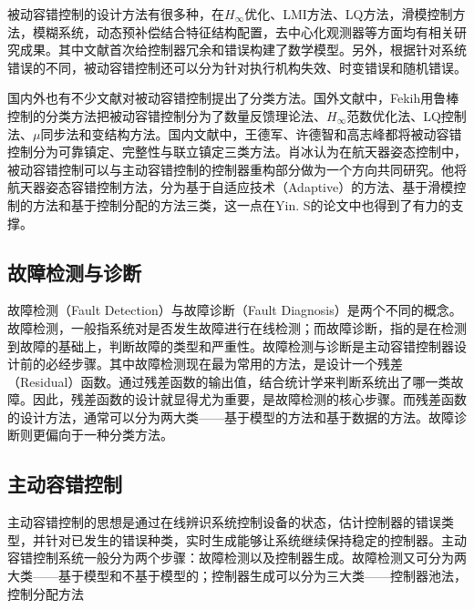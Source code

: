 \documentclass{article}
\begin{document}
被动容错控制的设计方法有很多种，在$H_\infty$优化\cite{119629,7850999}、LMI方法\cite{7795198,974340,1236798}、LQ方法\cite{VEILLETTE1995137,847106,866928}，滑模控制方法\cite{4160860}，模糊系统\cite{7795198,7505963,Zha20173267}，动态预补偿结合特征结构配置\cite{Jiang2000Design,ZHAO19981267}，去中心化观测器\cite{70346}等方面均有相关研究成果。其中文献\cite{ZHAO19981267}首次给控制器冗余和错误构建了数学模型。另外，根据针对系统错误的不同，被动容错控制还可以分为针对执行机构失效\cite{ZHAO19981267,974340,VEILLETTE1995137,1236798,Tian20101907,Li20132455,7353144,7863042,70346,866928}、时变错误\cite{7850999,CHEN2004349,6064886}和随机错误\cite{7795198,7505963,5540530,Zha20173267}。

国内外也有不少文献对被动容错控制提出了分类方法。国外文献中，Fekih\cite{6859271}用鲁棒控制的分类方法把被动容错控制分为了数量反馈理论法、$H_\infty$范数优化法\cite{4079591}、LQ控制法\cite{Staroswiecki20072070}、$\mu$同步法和变结构方法。国内文献中，王德军\cite{wangdejun2014}、许德智\cite{xudezhi2013}和高志峰\cite{gaozhifeng2011}都将被动容错控制分为可靠镇定、完整性与联立镇定三类方法。肖冰\cite{xiaobing2014}认为在航天器姿态控制中，被动容错控制可以与主动容错控制的控制器重构部分做为一个方向共同研究。他将航天器姿态容错控制方法，分为基于自适应技术（Adaptive）的方法、基于滑模控制的方法和基于控制分配的方法三类，这一点在Yin. S的论文中\cite{7407616}也得到了有力的支撑。

\subsection{故障检测与诊断}\label{subsec:fdd}
故障检测（Fault Detection）与故障诊断（Fault Diagnosis）是两个不同的概念。故障检测，一般指系统对是否发生故障进行在线检测；而故障诊断，指的是在检测到故障的基础上，判断故障的类型和严重性。故障检测与诊断是主动容错控制器设计前的必经步骤。其中故障检测现在最为常用的方法，是设计一个残差（Residual）函数。通过残差函数的输出值，结合统计学来判断系统出了哪一类故障。因此，残差函数的设计就显得尤为重要，是故障检测的核心步骤。而残差函数的设计方法，通常可以分为两大类——基于模型的方法和基于数据的方法。故障诊断则更偏向于一种分类方法。
\subsection{主动容错控制}\label{subsec:active}
主动容错控制的思想是通过在线辨识系统控制设备的状态，估计控制器的错误类型，并针对已发生的错误种类，实时生成能够让系统继续保持稳定的控制器。主动容错控制系统一般分为两个步骤：故障检测以及控制器生成。故障检测又可分为两大类——基于模型和不基于模型的；控制器生成可以分为三大类——控制器池法，控制分配方法
\end{document}
